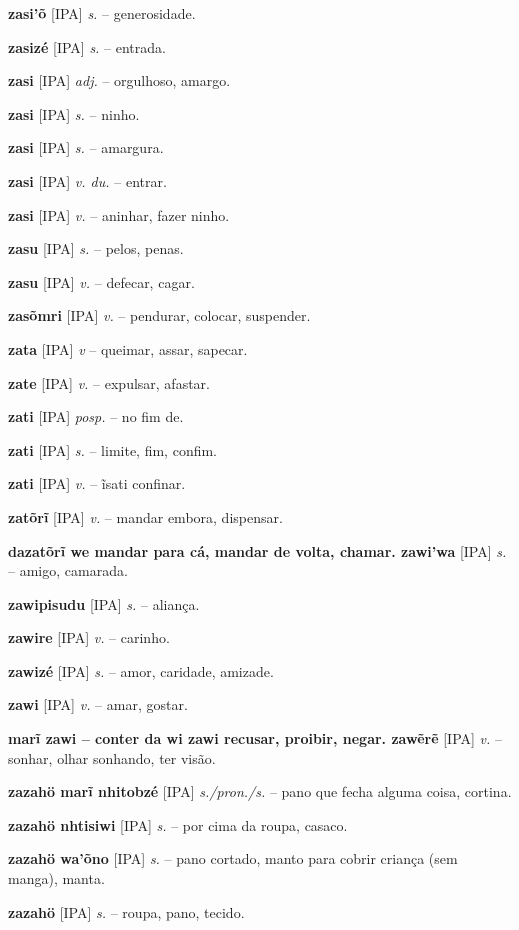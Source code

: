 {{{{{\textbf{zasi'õ} [IPA] \textit{s.} -- generosidade.

\textbf{zasizé} [IPA] \textit{s.} -- entrada.

\textbf{zasi} [IPA] \textit{adj.} -- orgulhoso, amargo.

\textbf{zasi} [IPA] \textit{s.} -- ninho.

\textbf{zasi} [IPA] \textit{s.} -- amargura.

\textbf{zasi} [IPA] \textit{v. du.} -- entrar.

\textbf{zasi} [IPA] \textit{v.} -- aninhar, fazer ninho.

\textbf{zasu} [IPA] \textit{s.} -- pelos, penas.

\textbf{zasu} [IPA] \textit{v.} -- defecar, cagar.

\textbf{zasõmri} [IPA] \textit{v.} -- pendurar, colocar, suspender.

\textbf{zata} [IPA] \textit{v} -- queimar, assar, sapecar.

\textbf{zate} [IPA] \textit{v.} -- expulsar, afastar.

\textbf{zati} [IPA] \textit{posp.} -- no fim de.

\textbf{zati} [IPA] \textit{s.} -- limite, fim, confim.

\textbf{zati} [IPA] \textit{v.} -- ĩsati confinar.

\textbf{zatõrĩ} [IPA] \textit{v.} -- mandar embora, dispensar.

\textbf{dazatõrĩ we mandar para cá, mandar de volta, chamar. zawi'wa} [IPA] \textit{s.} -- amigo, camarada.

\textbf{zawipisudu} [IPA] \textit{s.} -- aliança.

\textbf{zawire} [IPA] \textit{v.} -- carinho.

\textbf{zawizé} [IPA] \textit{s.} -- amor, caridade, amizade.

\textbf{zawi} [IPA] \textit{v.} -- amar, gostar.

\textbf{marĩ zawi -- conter  da wi zawi recusar, proibir, negar. zawẽrẽ} [IPA] \textit{v.} -- sonhar, olhar sonhando, ter visão.

\textbf{zazahö marĩ nhitobzé} [IPA] \textit{s./pron./s.} -- pano que fecha alguma coisa, cortina.

\textbf{zazahö nhtisiwi} [IPA] \textit{s.} -- por cima da roupa, casaco.

\textbf{zazahö wa'õno} [IPA] \textit{s.} -- pano cortado, manto para cobrir criança (sem manga), manta.

\textbf{zazahö} [IPA] \textit{s.} -- roupa, pano, tecido.

}}}}}
